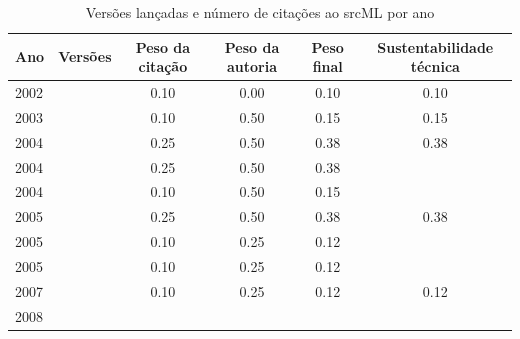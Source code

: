 \begin{table}[H]
\caption{Versões lançadas e número de citações ao srcML por ano}
\centering
\begin{tabular}{| l | c | c | c | c | c |}
  \hline
  Ano & Versões & Peso da citação & Peso da autoria & Peso final & Sustentabilidade técnica \\
  \hline
            2002
          &
          
          &
          0.10
          &
          0.00
          &
          0.10
          &
            {\color{red} 0.10}
          \\
\hline
            2003
          &
          
          &
          0.10
          &
          0.50
          &
          0.15
          &
            {\color{red} 0.15}
          \\
\hline
            2004
          &
          
          &
          0.25
          &
          0.50
          &
          0.38
          &
            {\color{red} 0.38}
          \\
            2004
          &
          
          &
          0.25
          &
          0.50
          &
          0.38
          &
          \\
            2004
          &
          
          &
          0.10
          &
          0.50
          &
          0.15
          &
          \\
\hline
            2005
          &
          
          &
          0.25
          &
          0.50
          &
          0.38
          &
            {\color{red} 0.38}
          \\
            2005
          &
          
          &
          0.10
          &
          0.25
          &
          0.12
          &
          \\
            2005
          &
          
          &
          0.10
          &
          0.25
          &
          0.12
          &
          \\
\hline
            2007
          &
          
          &
          0.10
          &
          0.25
          &
          0.12
          &
            {\color{red} 0.12}
          \\
\hline
            2008
          &
          

\end{tabular}
\end{table}
